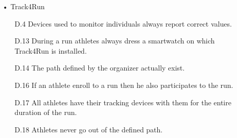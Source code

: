 \begin{enumerate}
\item[•] {\Large Track4Run}
	\begin{enumerate}
	\item [D.4] Devices used to monitor individuals always report correct values.
	\item [D.13] During a run athletes always dress a smartwatch on which Track4Run is installed.
	\item [D.14] The path defined by the organizer actually exist.
    \item [D.16] If an athlete enroll to a run then he also participates to the run.
    \item [D.17] All athletes have their tracking devices with them for the entire duration of the run.
    \item [D.18] Athletes never go out of the defined path.
	\end{enumerate}
\end{enumerate}